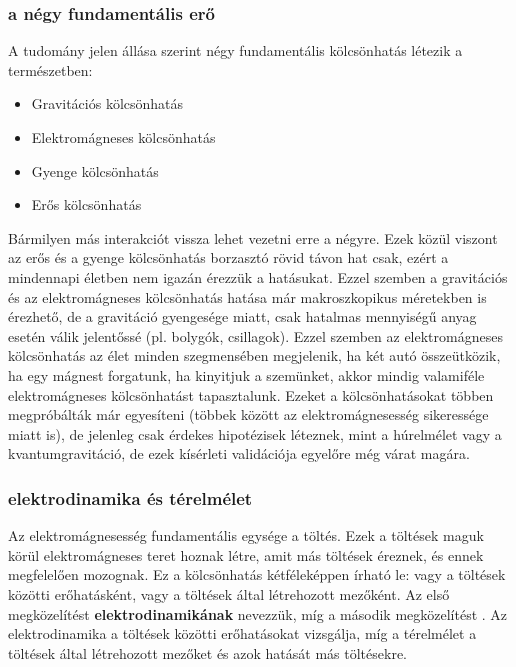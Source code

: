\documentclass[../main.tex]{subfiles}
\begin{document}
\subsubsection{a négy fundamentális erő}
A tudomány jelen állása szerint négy fundamentális kölcsönhatás létezik a természetben:
\begin{itemize}
    \item Gravitációs kölcsönhatás
    \item Elektromágneses kölcsönhatás
    \item Gyenge kölcsönhatás
    \item Erős kölcsönhatás
\end{itemize}
Bármilyen más interakciót vissza lehet vezetni erre a négyre. Ezek közül viszont az erős és a gyenge kölcsönhatás borzasztó rövid távon hat csak, ezért a mindennapi életben
nem igazán érezzük a hatásukat. Ezzel szemben a gravitációs és az elektromágneses kölcsönhatás hatása már makroszkopikus méretekben is érezhető, de a gravitáció gyengesége miatt,
csak hatalmas mennyiségű anyag esetén válik jelentőssé (pl. bolygók, csillagok). Ezzel szemben az elektromágneses kölcsönhatás az élet minden szegmensében megjelenik, ha 
két autó összeütközik, ha egy mágnest forgatunk, ha kinyitjuk a szemünket, akkor mindig valamiféle elektromágneses kölcsönhatást tapasztalunk.
\newline
\newline
Ezeket a kölcsönhatásokat többen megpróbálták már egyesíteni (többek között az elektromágnesesség sikeressége miatt is), de jelenleg csak érdekes hipotézisek léteznek, 
mint a húrelmélet vagy a kvantumgravitáció, de ezek kísérleti validációja egyelőre még várat magára.

\subsubsection{elektrodinamika és térelmélet}
Az elektromágnesesség fundamentális egysége a töltés. Ezek a töltések maguk körül elektromágneses teret hoznak létre, amit más töltések éreznek, és ennek megfelelően mozognak.
Ez a kölcsönhatás kétféleképpen írható le: vagy a töltések közötti erőhatásként, vagy a töltések által létrehozott mezőként. Az első megközelítést \textbf{elektrodinamikának} nevezzük,
míg a második megközelítést . Az elektrodinamika a töltések közötti erőhatásokat vizsgálja, míg a térelmélet a töltések által létrehozott mezőket és azok hatását más töltésekre.
\end{document}
